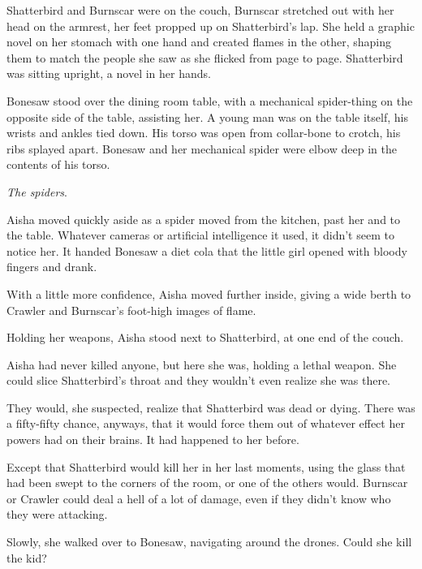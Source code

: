 Shatterbird and Burnscar were on the couch, Burnscar stretched out with her head on the armrest, her feet propped up on Shatterbird's lap.  She held a graphic novel on her stomach with one hand and created flames in the other, shaping them to match the people she saw as she flicked from page to page.  Shatterbird was sitting upright, a novel in her hands.



Bonesaw stood over the dining room table, with a mechanical spider-thing on the opposite side of the table, assisting her.  A young man was on the table itself, his wrists and ankles tied down.  His torso was open from collar-bone to crotch, his ribs splayed apart.  Bonesaw and her mechanical spider were elbow deep in the contents of his torso.



\emph{The spiders}.



Aisha moved quickly aside as a spider moved from the kitchen, past her and to the table.  Whatever cameras or artificial intelligence it used, it didn't seem to notice her.  It handed Bonesaw a diet cola that the little girl opened with bloody fingers and drank.



With a little more confidence, Aisha moved further inside, giving a wide berth to Crawler and Burnscar's foot-high images of flame.



Holding her weapons, Aisha stood next to Shatterbird, at one end of the couch.



Aisha had never killed anyone, but here she was, holding a lethal weapon.  She could slice Shatterbird's throat and they wouldn't even realize she was there.



They would, she suspected, realize that Shatterbird was dead or dying.  There was a fifty-fifty chance, anyways, that it would force them out of whatever effect her powers had on their brains.  It had happened to her before.



Except that Shatterbird would kill her in her last moments, using the glass that had been swept to the corners of the room, or one of the others would.  Burnscar or Crawler could deal a hell of a lot of damage, even if they didn't know who they were attacking.



Slowly, she walked over to Bonesaw, navigating around the drones.  Could she kill the kid?



